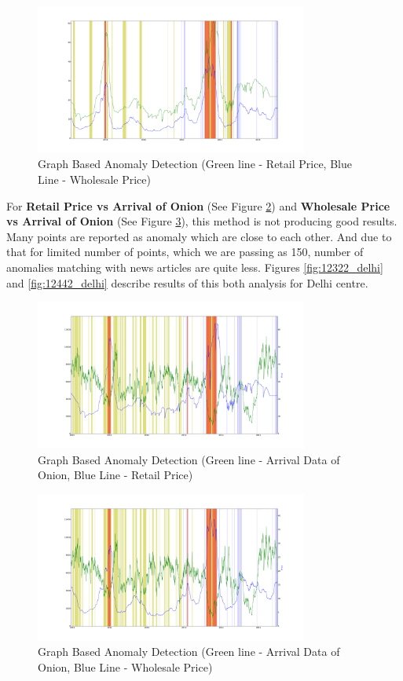 \documentclass[a4paper,10pt]{report}
\begin{document}
			\begin{figure}[H]
		    	\centering
  		    	\includegraphics[width=0.8\textwidth]{graphs/12331.png}
		    	\caption{Graph Based Anomaly Detection (Green line - Retail Price, Blue Line - Wholesale Price)}
		    	\label{fig:12331}
			\end{figure}
	
	For \textbf{Retail Price vs Arrival of Onion} (See Figure \ref{fig:12321}) and \textbf{Wholesale Price vs Arrival of Onion} (See Figure \ref{fig:12341}), this method is not producing good results. Many points are reported as anomaly which are close to each other. And due to that for limited number of points, which we are passing as 150, number of anomalies matching with news articles are quite less. Figures \ref{fig:12322_delhi} and \ref{fig:12442_delhi} describe results of this both analysis for Delhi centre.
			\begin{figure}[H]
		    	\centering
  		    	\includegraphics[width=0.8\textwidth]{graphs/12321.png}
		    	\caption{Graph Based Anomaly Detection (Green line - Arrival Data of Onion, Blue Line - Retail Price)}
		    	\label{fig:12321}
			\end{figure}
			
			\begin{figure}[H]
		    	\centering
  		    	\includegraphics[width=0.8\textwidth]{graphs/12341.png}
		    	\caption{Graph Based Anomaly Detection (Green line - Arrival Data of Onion, Blue Line - Wholesale Price)}
		    	\label{fig:12341}
			\end{figure}
			
\end{document}
